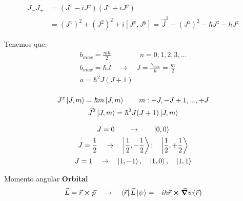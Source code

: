 \documentclass{article}
\begin{document}
\begin{align*}
  J _{-  } J _{+ } &= (J^x - iJ^y )(J^x + i J^y )\\
              &= (J^x)^2 + (J^2)^2 + i [J^x, J^y ] = \vec J^2 - (J^z)^2 - \hbar J^z - \hbar J^z
\end{align*}

Tenemos que: 
\begin{gather*}
  b _{max } = \frac{m \hbar }{2} \qquad \qquad n = 0,1,2,3,...\\
  b _{max } = \hbar  J \quad \rightarrow \quad J = \frac{b _{max } }{\hbar } = \frac{m}{2}\\
  a = \hbar  ^2 J(J+1)\\
\end{gather*}

\begin{gather*}
  J^z \ket{J,m } = \hbar  m \ket{J,m } \qquad m: -J,-J+1,...,+J\\
  \vec J ^2 \ket{J, m } = \hbar ^2 J(J+1) \ket{J, m }
\end{gather*}

\begin{gather*}
  J = 0 \qquad \rightarrow \qquad \ket{0,0 }\\
  J = \frac{1}{2} \quad \rightarrow \quad \ket{ \frac{1}{2}, - \frac{1}{2}}; \quad \ket{\frac{1 }{2}, + \frac{1}{2}}\\
  J = 1 \quad \rightarrow \quad \ket{1,-1 }, \quad \ket{1, 0 }, \quad \ket{1, 1 }
\end{gather*}

Momento angular \textbf{Orbital }
\begin{gather*}
  \vec L = \vec r \cross \vec p \quad \rightarrow \quad \bra{\vec r } \vec L \ket{\psi} = - i \hbar \vec r \cross \vec \grad \psi(\vec r )
\end{gather*}
\end{document}
